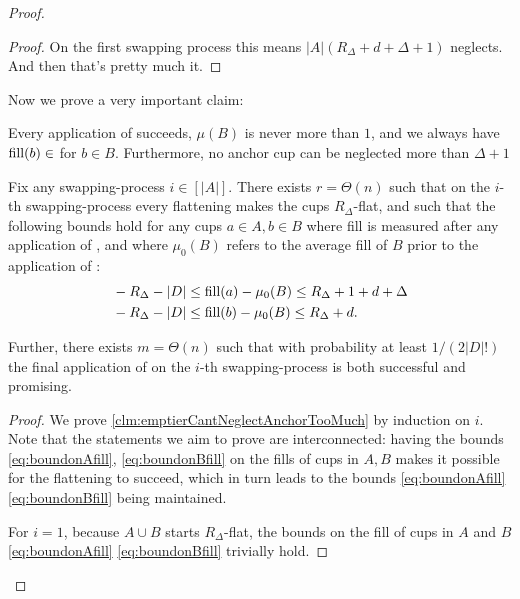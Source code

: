\begin{proof}
\begin{proof}
  On the first swapping process this means $|A| (R_\Delta + d + \Delta + 1)$
  neglects. 
  And then that's pretty much it.

\end{proof}

Now we prove a very important claim:
\begin{clm}
  \label{clm:emptierCantNeglectAnchorTooMuch}
  Every application of \flatalg succeeds, $\mu(B)$ is never
  more than $1$, and we always have $\operatorname{\textnormal{fill}}(b) \in $ for $b\in B$. 
  Furthermore, no anchor cup can be neglected more than $\Delta + 1$

  Fix any swapping-process $i \in [|A|]$. 
  There exists $r = \Theta(n)$ such that on the $i$-th swapping-process every
  flattening makes the cups $R_\Delta$-flat, and such that the
  following bounds hold for any cups $a\in A, b\in B$ where fill
  is measured after any application of \randalg, and where
  $\mu_0(B)$ refers to the average fill of $B$ prior to the
  application of \randalg:
  \begin{align}
    & - R_\Delta - |D| \le \operatorname{\textnormal{fill}}(a) -\mu_0(B) \le R_\Delta + 1 + d + \Delta \label{eq:boundonAfill}\\
    & - R_\Delta - |D| \le \operatorname{\textnormal{fill}}(b) - \mu_0(B) \le R_\Delta + d. \label{eq:boundonBfill}
  \end{align}

  Further, there exists $m=\Theta(n)$ such that with probability
  at least $1/(2|D|!)$ the final application of \randalg on the $i$-th
  swapping-process is both successful and promising.
\end{clm}
\begin{proof}

  We prove \cref{clm:emptierCantNeglectAnchorTooMuch} by
  induction on $i$. Note that the statements we aim to prove are
  interconnected: having the bounds \eqref{eq:boundonAfill},
  \eqref{eq:boundonBfill} on the fills of cups in $A, B$ makes it
  possible for the flattening to succeed, which in turn leads to
  the bounds \eqref{eq:boundonAfill} \eqref{eq:boundonBfill}
  being maintained.

  For $i=1$, because $A\cup B$ starts $R_\Delta$-flat, the bounds
  on the fill of cups in $A$ and $B$ \eqref{eq:boundonAfill}
  \eqref{eq:boundonBfill} trivially hold.


\end{proof}
\end{proof}
